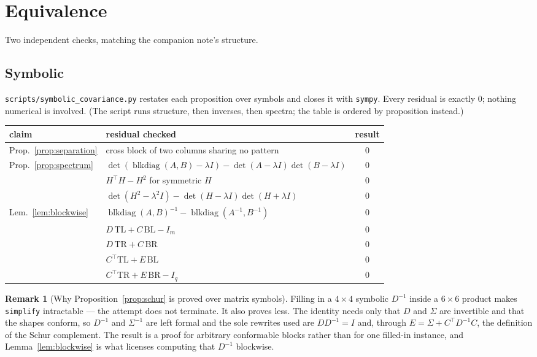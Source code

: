\documentclass[11pt,a4paper]{article}
\theoremstyle{plain}
\theoremstyle{definition}
\newtheorem{remark}[proposition]{Remark}
\newcommand{\blkdiag}{\operatorname{blkdiag}}
\begin{document}
\section{Equivalence}

Two independent checks, matching the companion note's structure.

\subsection{Symbolic}

\texttt{scripts/symbolic\_covariance.py} restates each proposition over symbols and closes it
with \texttt{sympy}. Every residual is exactly $0$; nothing numerical is involved. (The script
runs structure, then inverses, then spectra; the table is ordered by proposition instead.)

\begin{center}
\begin{tabular}{llc}
\toprule
claim & residual checked & result\\
\midrule
Prop.~\ref{prop:separation} & cross block of two columns sharing no pattern & $0$\\
\addlinespace
Prop.~\ref{prop:spectrum} & $\det(\blkdiag(A,B)-\lambda I) - \det(A-\lambda I)\det(B-\lambda I)$ & $0$\\
\addlinespace
\multirow{2}{*}{Prop.~\ref{prop:eigh}}
 & $H^\top H - H^2$ for symmetric $H$ & $0$\\
 & $\det(H^2-\lambda^2 I) - \det(H-\lambda I)\det(H+\lambda I)$ & $0$\\
\addlinespace
Lem.~\ref{lem:blockwise} & $\blkdiag(A,B)^{-1} - \blkdiag(A^{-1},B^{-1})$ & $0$\\
\addlinespace
\multirow{4}{*}{Prop.~\ref{prop:schur}}
 & $D\,\mathrm{TL} + C\,\mathrm{BL} - I_m$ & $0$\\
 & $D\,\mathrm{TR} + C\,\mathrm{BR}$ & $0$\\
 & $C^\top \mathrm{TL} + E\,\mathrm{BL}$ & $0$\\
 & $C^\top \mathrm{TR} + E\,\mathrm{BR} - I_q$ & $0$\\
\bottomrule
\end{tabular}
\end{center}

\begin{remark}[Why Proposition~\ref{prop:schur} is proved over matrix symbols]
Filling in a $4\times4$ symbolic $D^{-1}$ inside a $6\times6$ product makes \texttt{simplify}
intractable --- the attempt does not terminate. It also proves less. The identity needs only
that $D$ and $\Sigma$ are invertible and that the shapes conform, so $D^{-1}$ and $\Sigma^{-1}$
are left formal and the sole rewrites used are $DD^{-1} = I$ and, through
$E = \Sigma + C^\top D^{-1}C$, the definition of the Schur complement. The result is a proof for
arbitrary conformable blocks rather than for one filled-in instance, and
Lemma~\ref{lem:blockwise} is what licenses computing that $D^{-1}$ blockwise.
\end{remark}
\end{document}
